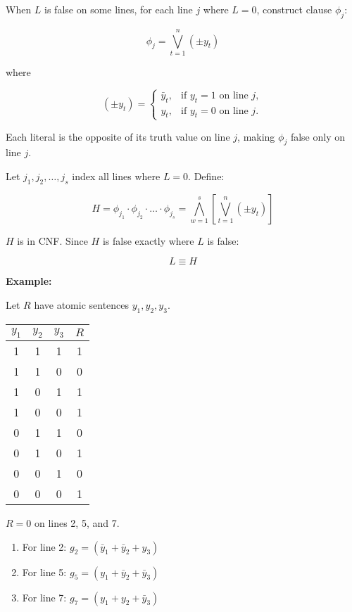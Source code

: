 \documentclass[12pt,a4paper,openany]{article}
\begin{document}
When $L$ is false on some lines, for each line $j$ where $L = 0$,
construct clause $\phi_j$:

$$\phi_j = \displaystyle\bigvee_{t=1}^{n} (\pm y_t)$$

where

$$
(\pm y_t) =
\begin{cases}
\bar y_t, & \text{if } y_t = 1 \text{ on line } j, \\
y_t, & \text{if } y_t = 0 \text{ on line } j.
\end{cases}
$$

Each literal is the opposite of its truth value on line $j$, making
$\phi_j$ false only on line $j$.

Let $j_1, j_2, \dots, j_s$ index all lines where $L = 0$. Define:

$$H = \phi_{j_1} \cdot \phi_{j_2} \cdot \dots \cdot \phi_{j_s} = \displaystyle\bigwedge_{w=1}^{s} \left[ \bigvee_{t=1}^{n} (\pm y_t) \right]$$

$H$ is in CNF. Since $H$ is false exactly where $L$ is false:

$$L \equiv H$$

\textbf{Example:}

Let $R$ have atomic sentences $y_1, y_2, y_3$.

\begin{center}
\begin{tabular}{|c|c|c|c|}
\hline
$y_1$ & $y_2$ & $y_3$ & $R$ \\
\hline
1 & 1 & 1 & 1 \\
\hline
1 & 1 & 0 & 0 \\
\hline
1 & 0 & 1 & 1 \\
\hline
1 & 0 & 0 & 1 \\
\hline
0 & 1 & 1 & 0 \\
\hline
0 & 1 & 0 & 1 \\
\hline
0 & 0 & 1 & 0 \\
\hline
0 & 0 & 0 & 1 \\
\hline
\end{tabular}
\end{center}

$R = 0$ on lines 2, 5, and 7.

\begin{enumerate}
\item For line 2: $g_2 = (\bar y_1 + \bar y_2 + y_3)$
\item For line 5: $g_5 = (y_1 + \bar y_2 + \bar y_3)$
\item For line 7: $g_7 = (y_1 + y_2 + \bar y_3)$
\end{enumerate}
\end{document}

